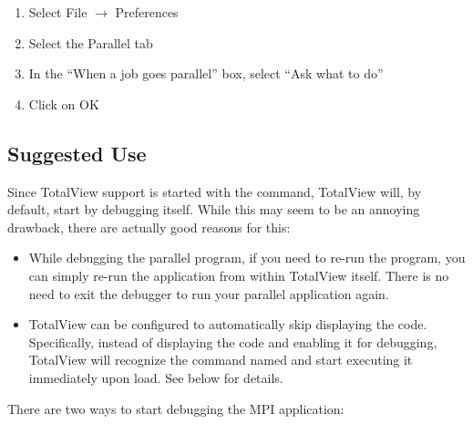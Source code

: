 \begin{enumerate}
\item Select File $\rightarrow$ Preferences
\item Select the Parallel tab
\item In the ``When a job goes parallel'' box, select ``Ask what to do''
\item Click on OK
\end{enumerate}


\subsection{Suggested Use}

Since TotalView support is started with the  command,
TotalView will, by default, start by debugging  itself.
While this may seem to be an annoying drawback, there are actually 
good reasons for this:

\begin{itemize}
\item While debugging the parallel program, if you need to re-run the
  program, you can simply re-run the application from within TotalView
  itself.  There is no need to exit the debugger to run your parallel
  application again.
  
\item TotalView can be configured to automatically skip displaying the
   code.  Specifically, instead of displaying the
   code and enabling it for debugging, TotalView will
  recognize the command named  and start executing it
  immediately upon load.  See below for details.
\end{itemize}

\noindent There are two ways to start debugging the MPI application:

